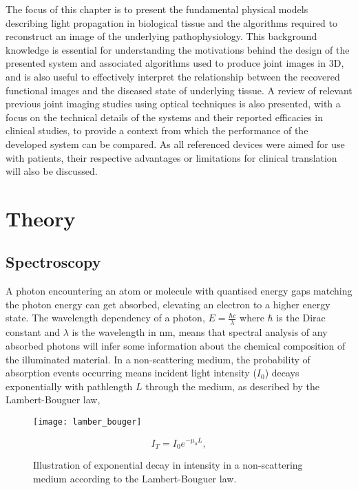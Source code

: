 \documentclass[twoside]{bhamthesis}
\theoremstyle{definition}
\begin{document}
The focus of this chapter is to present the fundamental physical models describing light propagation in biological tissue and the algorithms required to reconstruct an image of the underlying pathophysiology. This background knowledge is essential for understanding the motivations behind the design of the presented system and associated algorithms used to produce joint images in 3D, and is also useful to effectively interpret the relationship between the recovered functional images and the diseased state of underlying tissue. A review of relevant previous joint imaging studies using optical techniques is also presented, with a focus on the technical details of the systems and their reported efficacies in clinical studies, to provide a context from which the performance of the developed system can be compared. As all referenced devices were aimed for use with patients, their respective advantages or limitations for clinical translation will also be discussed.

\section{Theory}

\subsection{Spectroscopy}

A photon encountering an atom or molecule with quantised energy gaps matching the photon energy can get absorbed, elevating an electron to a higher energy state. The wavelength dependency of a photon, $E = \frac{\hbar c}{\lambda}$ where $\hbar$ is the Dirac constant and $\lambda$ is the wavelength in nm, means that spectral analysis of any absorbed photons will infer some information about the chemical composition of the illuminated material. In a non-scattering medium, the probability of absorption events occurring means incident light intensity ($I_0$) decays exponentially with pathlength $L$ through the medium, as described by the Lambert-Bouguer law,

\begin{figure}[!ht]
	\begin{minipage}{.7\textwidth}
    \centering
    \texttt{[image: lamber\_bouger]}
    \caption{Illustration of exponential decay in intensity in a non-scattering medium according to the Lambert-Bouguer law.}  
  \end{minipage}%
  \begin{minipage}{.3\textwidth}
     \begin{equation}
	I_T = I_0 e ^{-\mu _a L},
  	\label{eqn:Lambert-Bouger}
    \end{equation}
  \end{minipage}
\end{figure}
\end{document}
